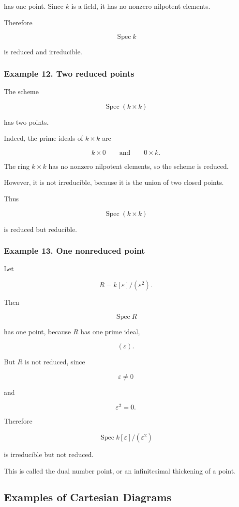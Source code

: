 \documentclass[12pt,a4paper]{article}
\theoremstyle{notespace}
\begin{document}
has one point. Since \(k\) is a field, it has no nonzero nilpotent elements.

Therefore

\[
\operatorname{Spec}k
\]

is reduced and irreducible.

\subsubsection{Example 12. Two reduced points}

The scheme

\[
\operatorname{Spec}(k\times k)
\]

has two points.

Indeed, the prime ideals of \(k\times k\) are

\[
k\times 0
\qquad
\text{and}
\qquad
0\times k.
\]

The ring \(k\times k\) has no nonzero nilpotent elements, so the scheme is reduced.

However, it is not irreducible, because it is the union of two closed points.

Thus

\[
\operatorname{Spec}(k\times k)
\]

is reduced but reducible.

\subsubsection{Example 13. One nonreduced point}

Let

\[
R=k[\varepsilon]/(\varepsilon^2).
\]

Then

\[
\operatorname{Spec}R
\]

has one point, because \(R\) has one prime ideal,

\[
(\varepsilon).
\]

But \(R\) is not reduced, since

\[
\varepsilon\neq 0
\]

and

\[
\varepsilon^2=0.
\]

Therefore

\[
\operatorname{Spec}k[\varepsilon]/(\varepsilon^2)
\]

is irreducible but not reduced.

This is called the dual number point, or an infinitesimal thickening of a point.

\subsection{Examples of Cartesian Diagrams}
\end{document}
